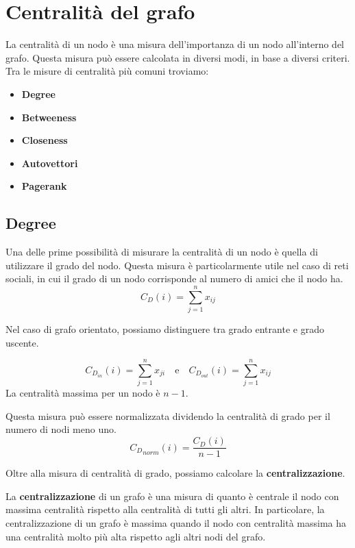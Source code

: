 \section{Centralità del grafo}
La centralità di un nodo è una misura dell'importanza di un nodo all'interno
del grafo. Questa misura può essere calcolata in diversi modi, in base a
diversi criteri. Tra le misure di centralità più comuni troviamo:
\begin{itemize}
    \item \textbf{Degree}
    \item \textbf{Betweeness}
    \item \textbf{Closeness}
    \item \textbf{Autovettori}
    \item \textbf{Pagerank}
\end{itemize}
\subsection{Degree}
Una delle prime possibilità di misurare la centralità di un nodo è quella di
utilizzare il grado del nodo. Questa misura è particolarmente utile nel caso di
reti sociali, in cui il grado di un nodo corrisponde al numero di amici che
il nodo ha.
\begin{equation}
    C_D(i) = \sum_{j=1}^{n} x_{ij}
\end{equation}

Nel caso di grafo orientato, possiamo distinguere tra grado entrante e grado
uscente.

\begin{equation}
    C_{D_{in}}(i) = \sum_{j=1}^{n} x_{ji} \quad \text{e} \quad
    C_{D_{out}}(i) = \sum_{j=1}^{n} x_{ij}
\end{equation}
La centralità massima per un nodo è $n - 1$.

Questa misura può essere normalizzata
dividendo la centralità di grado per il numero di nodi meno uno.
\begin{equation*}
    {C_D}_{norm} (i)= \frac{C_D(i)}{n-1}
\end{equation*}

Oltre alla misura di centralità di grado, possiamo calcolare la \textbf{centralizzazione}.
\begin{definizione}
    La \textbf{centralizzazione} di un grafo è una misura di quanto è centrale il
    nodo con massima centralità rispetto alla centralità di tutti gli altri.
    In particolare, la centralizzazione
    di un grafo è massima quando il nodo con centralità massima ha una centralità
    molto più alta rispetto agli altri nodi del grafo.
\end{definizione}

